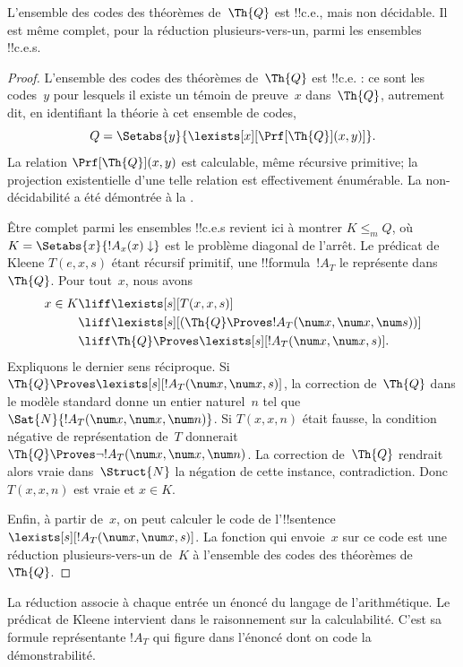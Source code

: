 \documentclass[../../../include/open-logic-section]{subfiles}
\begin{document}


\begin{thm}
L'ensemble des codes des théorèmes de~$\Th{Q}$ est
!!{c.e.}, mais non décidable. Il est même complet,
pour la réduction plusieurs-vers-un, parmi les
ensembles !!{c.e.}s.
\end{thm}

\begin{proof}
L'ensemble des codes des théorèmes de~$\Th{Q}$ est
!!{c.e.} : ce sont les codes~$y$ pour lesquels il
existe un témoin de preuve~$x$ dans~$\Th{Q}$,
autrement dit, en identifiant la théorie à cet
ensemble de codes,
\[
Q = \Setabs{y}{\lexists[x][\Prf[\Th{Q}](x,y)]}.
\]
La relation $\Prf[\Th{Q}](x,y)$ est calculable,
même récursive primitive; la projection existentielle
d'une telle relation est effectivement énumérable.
La non-décidabilité a été démontrée à la
.

Être complet parmi les ensembles !!{c.e.}s revient
ici à montrer $K\leq_m Q$, où
$K=\Setabs{x}{!A_x(x)\downarrow}$ est le problème
diagonal de l'arrêt. Le prédicat de Kleene $T(e,x,s)$
étant récursif primitif, une !!{formula}~$!A_T$ le
représente dans~$\Th{Q}$. Pour tout~$x$, nous avons
\begin{align*}
x \in K & \liff \lexists[s][T(x,x,s)] \\
& \liff \lexists[s][(\Th{Q} \Proves !A_T(\num x,\num x, \num s))]
  \\
& \liff \Th{Q} \Proves \lexists[s][!A_T(\num x, \num x, s)].
\end{align*}
Expliquons le dernier sens réciproque. Si
$\Th{Q}\Proves\lexists[s][!A_T(\num x,\num x,s)]$,
la correction de~$\Th{Q}$ dans le modèle standard
donne un entier naturel~$n$ tel que
$\Sat{N}{!A_T(\num x,\num x,\num n)}$.
Si $T(x,x,n)$ était fausse, la condition négative
de représentation de~$T$ donnerait
$\Th{Q}\Proves\lnot !A_T(\num x,\num x,\num n)$.
La correction de~$\Th{Q}$ rendrait alors vraie
dans~$\Struct{N}$ la négation de cette instance,
contradiction. Donc $T(x,x,n)$ est vraie et
$x\in K$.

Enfin, à partir de~$x$, on peut calculer le code
de l'!!{sentence}
$\lexists[s][!A_T(\num x,\num x,s)]$.
La fonction qui envoie~$x$ sur ce code est une
réduction plusieurs-vers-un de~$K$ à l'ensemble
des codes des théorèmes de~$\Th{Q}$.
\end{proof}

\begin{explain}
La réduction associe à chaque entrée un énoncé du langage de
l'arithmétique. Le prédicat de Kleene intervient dans le
raisonnement sur la calculabilité. C'est sa formule
représentante $!A_T$ qui figure dans l'énoncé dont on code
la démonstrabilité.
\end{explain}
\end{document}
